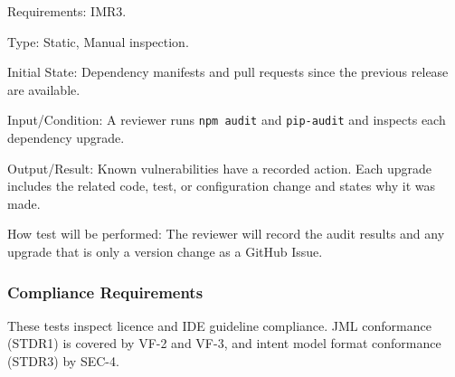 \documentclass[12pt, titlepage]{article}
\begin{document}
\begin{enumerate}
Requirements: IMR3.

Type: Static, Manual inspection.

Initial State: Dependency manifests and pull requests since the previous release are
available.

Input/Condition: A reviewer runs \texttt{npm audit} and \texttt{pip-audit} and inspects
each dependency upgrade.

Output/Result: Known vulnerabilities have a recorded action. Each upgrade includes the
related code, test, or configuration change and states why it was made.

How test will be performed: The reviewer will record the audit results and any upgrade
that is only a version change as a GitHub Issue.

\end{enumerate}

\subsubsection{Compliance Requirements}

These tests inspect licence and IDE guideline compliance. JML conformance (STDR1) is
covered by VF-2 and VF-3, and intent model format conformance (STDR3) by SEC-4.
\end{document}
